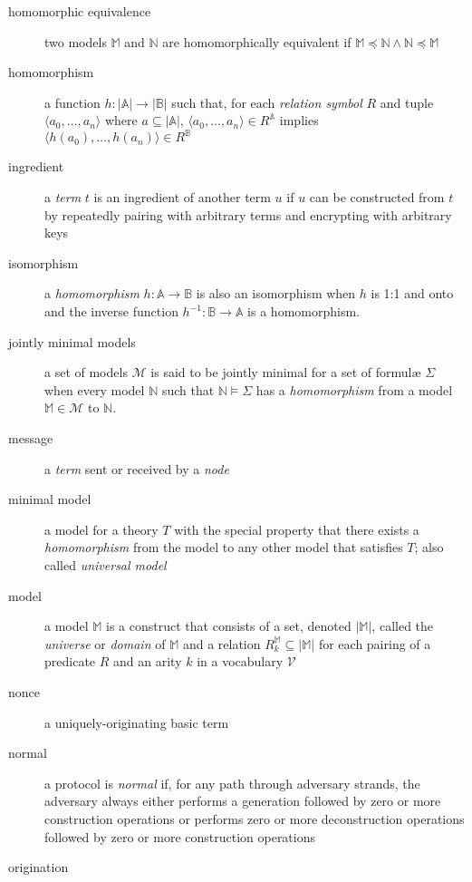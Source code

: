 \begin{description}
		\item[homomorphic equivalence]
			two models $\mathbb{M}$ and $\mathbb{N}$ are homomorphically
			equivalent if $\mathbb{M} \preceq \mathbb{N} \wedge \mathbb{N}
			\preceq \mathbb{M}$
		\item[homomorphism]
			a function $h: |\mathbb{A}|\to|\mathbb{B}|$ such that, for each
			\emph{relation symbol} $R$ and tuple $\langle a_0 , \ldots , a_n
			\rangle$ where $a \subseteq |\mathbb{A}|$, $\langle a_0 , \ldots ,
			a_n \rangle \in R^\mathbb{A}$ implies $\langle h(a_0) , \ldots ,
			h(a_n) \rangle \in R^\mathbb{B}$
		\item[ingredient]
			a \emph{term} $t$ is an ingredient of another term $u$ if $u$ can
			be constructed from $t$ by repeatedly pairing with arbitrary terms
			and encrypting with arbitrary keys
		\item[isomorphism]
			a \emph{homomorphism} $h : \mathbb{A} \to \mathbb{B}$ is also an
			isomorphism when $h$ is 1:1 and onto and the inverse
			function $h^{-1} : \mathbb{B} \to \mathbb{A}$ is a homomorphism.
		\item[jointly minimal models]
			a set of models $\mathcal{M}$ is said to be jointly minimal
			for a set of formul{\ae} $\Sigma$ when every model $\mathbb{N}$
			such that $\mathbb{N} \models \Sigma$ has a \emph{homomorphism} from a
			model $\mathbb{M} \in \mathcal{M}$ to $\mathbb{N}$.
		\item[message]
			a \emph{term} sent or received by a \emph{node}
		\item[minimal model]
			a model for a theory $T$ with the special property that there exists
			a \emph{homomorphism} from the model to any other model that
			satisfies $T$; also called \emph{universal model}
		\item[model]
			a model $\mathbb{M}$ is a construct that consists of a set, denoted
			$|\mathbb{M}|$, called the \emph{universe} or \emph{domain} of
			$\mathbb{M}$ and a relation $R^\mathbb{M}_k \subseteq |\mathbb{M}|$
			for each pairing of a predicate $R$ and an arity $k$ in a vocabulary
			$\mathcal{V}$
		\item[nonce]
			a uniquely-originating basic term
		\item[normal]
			a protocol is \emph{normal} if, for any path through adversary
			strands, the adversary always either performs a generation followed
			by zero or more construction operations or performs zero or more
			deconstruction operations followed by zero or more construction
			operations
		\item[origination]

\end{description}
